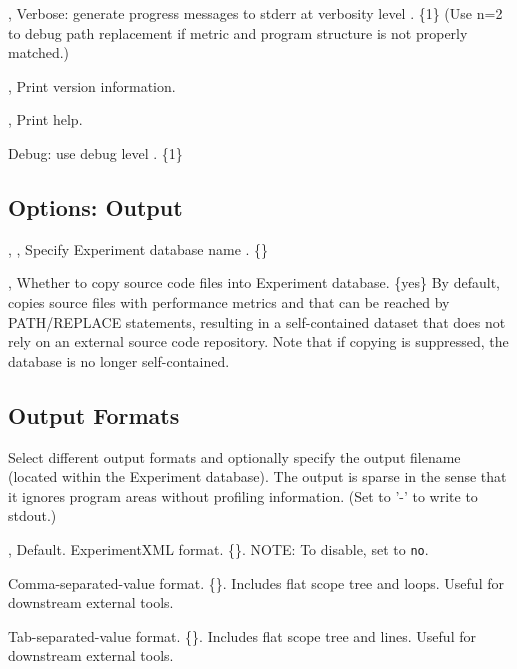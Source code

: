 \documentclass[english]{article}
\begin{document}
\begin{Description}
\item[\OptoArg{-v}{n}, \OptoArg{--verbose}{n}] Verbose: generate progress messages to stderr at verbosity level .  \{1\}  (Use n=2 to debug path replacement if metric and program structure is not properly matched.)
\item[\Opt{-V}, \Opt{--version}] Print version information.
\item[\Opt{-h}, \Opt{--help}] Print help.
\item[\OptoArg{--debug}{n}]   Debug: use debug level . \{1\}
\end{Description}


\subsection{Options: Output}

\begin{Description}
  \item[\OptArg{-o}{db-path}, \OptArg{--db}{db-path}, \OptArg{--output}{db-path}] Specify Experiment database name .  \{\}
  \item[\OptoArg{--src}{yes \Bar\ no}, \OptoArg{--source}{yes \Bar\ no}] Whether to copy source code files into Experiment database. \{yes\} By default,  copies source files with performance metrics and that can be reached by PATH/REPLACE statements, resulting in a self-contained dataset that does not rely on an external source code repository.  Note that if copying is suppressed, the database is no longer self-contained.
\end{Description}


\subsection{Output Formats}

Select different output formats and optionally specify the output filename  (located within the Experiment database). The output is sparse in the sense that it ignores program areas without profiling information. (Set  to '-' to write to stdout.)

\begin{Description}
  \item[\OptoArg{-x}{fname}, \OptoArg{--experiment}{fname}] Default.  ExperimentXML format. \{\}.  NOTE: To disable, set  to \verb+no+.
  \item[\OptoArg{--csv}{fname}] Comma-separated-value format. \{\}. Includes flat scope tree and loops.  Useful for downstream external tools.
  \item[\OptoArg{--tsv}{fname}] Tab-separated-value format. \{\}. Includes flat scope tree and lines.  Useful for downstream external tools.
\end{Description}
\end{document}
